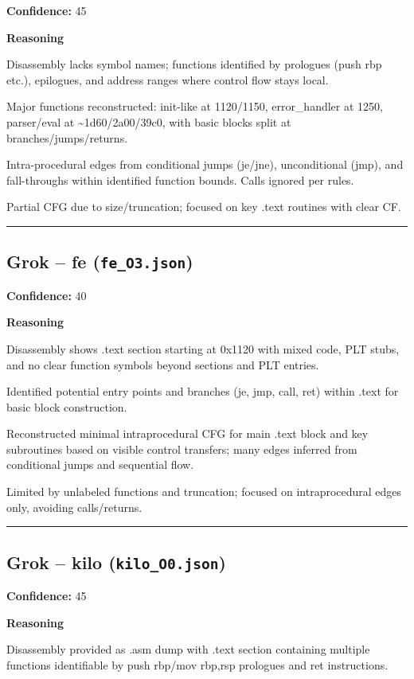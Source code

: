 \textbf{Confidence:} 45

\textbf{Reasoning}

Disassembly lacks symbol names; functions identified by prologues (push rbp etc.), epilogues, and address ranges where control flow stays local.

Major functions reconstructed: init-like at 1120/1150, error\_handler at 1250, parser/eval at \textasciitilde{}1d60/2a00/39c0, with basic blocks split at branches/jumps/returns.

Intra-procedural edges from conditional jumps (je/jne), unconditional (jmp), and fall-throughs within identified function bounds. Calls ignored per rules.

Partial CFG due to size/truncation; focused on key .text routines with clear CF.

\bigskip
\hrule
\bigskip

\subsection{Grok -- fe (\texttt{fe\_O3.json})}

\textbf{Confidence:} 40

\textbf{Reasoning}

Disassembly shows .text section starting at 0x1120 with mixed code, PLT stubs, and no clear function symbols beyond sections and PLT entries.

Identified potential entry points and branches (je, jmp, call, ret) within .text for basic block construction.

Reconstructed minimal intraprocedural CFG for main .text block and key subroutines based on visible control transfers; many edges inferred from conditional jumps and sequential flow.

Limited by unlabeled functions and truncation; focused on intraprocedural edges only, avoiding calls/returns.

\bigskip
\hrule
\bigskip

\subsection{Grok -- kilo (\texttt{kilo\_O0.json})}

\textbf{Confidence:} 45

\textbf{Reasoning}

Disassembly provided as .asm dump with .text section containing multiple functions identifiable by push rbp/mov rbp,rsp prologues and ret instructions.

